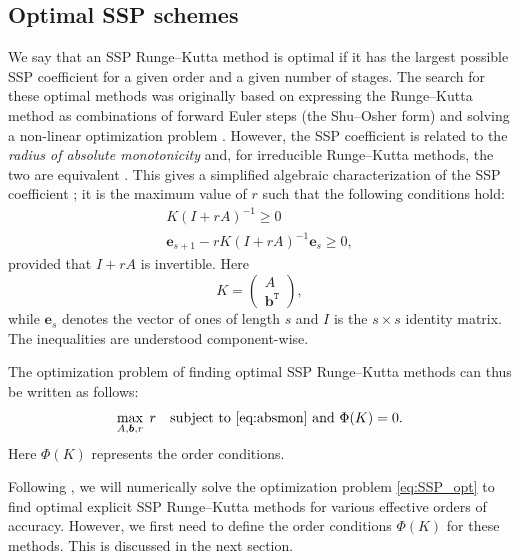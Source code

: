 \documentclass[final]{siamltex}  %
\begin{document}
\subsection{Optimal SSP schemes}\label{subsec:Optimal_SSPRK}
We say that an SSP Runge--Kutta method is optimal if it has the largest 
possible SSP coefficient for a given order and a given number of stages.
The search for these optimal methods was originally based on
expressing the Runge--Kutta method as combinations of forward Euler
steps (the Shu--Osher form) and solving a non-linear optimization
problem \cite{Gottlieb/Shu:1998, Gottlieb2001, Spiteri2003a, Spiteri2003b, 
Ruuth2004, Ruuth:2006}.
However, the SSP coefficient is related to the 
\emph{radius of absolute monotonicity} \cite{Kraaijevanger1991} and, 
for irreducible Runge--Kutta methods, the two are equivalent 
\cite{Ferracina2004, Higueras2004}.
This gives a simplified algebraic characterization of the SSP coefficient
\cite{Ferracina2005}; it is the maximum value of $r$ such that the following
conditions hold:
\begin{subequations} \label{eq:absmon}
\begin{align}
    K(I + rA)^{-1} \geq 0 \\
    \bm{e}_{s+1} - rK(I + rA)^{-1}\bm{e}_{s} \geq 0,
\end{align}
\end{subequations}
provided that $I + rA$ is invertible.
Here
\begin{equation*}
    K = \left(
            \begin{array}{c}
                     A              \\
                     \bm{b}^{\texttt{T}}
            \end{array}
         \right),
\end{equation*}
while $\bm{e}_s$ denotes the vector of ones of length $s$ and $I$ is the
$s \times s$ identity matrix.
The inequalities are understood component-wise.

The optimization problem of finding optimal SSP Runge--Kutta methods
can thus be written as follows:
\begin{equation}\label{eq:SSP_opt}
    \max_{A, \bm{b}, r} \; r \quad \text{subject to \eqref{eq:absmon} and } \Phi(K) = 0.
\end{equation}
Here \( \Phi(K) \) represents the  order conditions.

Following \cite{Ketcheson2008, Ketcheson/Macdonald/Gottlieb:2009}, 
we will numerically solve the optimization problem \eqref{eq:SSP_opt} to find
optimal explicit SSP Runge--Kutta methods for various effective orders of accuracy.
However, we first need to define the order conditions $\Phi(K)$ for these methods.
This is discussed in the next section.
\end{document}
